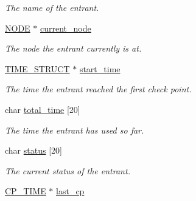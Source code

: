 \begin{DoxyCompactItemize}
\begin{DoxyCompactList}\small\item\em The name of the entrant. \end{DoxyCompactList}\item 
\hypertarget{structentrant_a3b2221eadaaa73e90690ba5d69af41e5}{\hyperlink{node_8h_a01aae0d1f45b520aec535df5f9d9afb7}{N\-O\-D\-E} $\ast$ \hyperlink{structentrant_a3b2221eadaaa73e90690ba5d69af41e5}{current\-\_\-node}}\label{structentrant_a3b2221eadaaa73e90690ba5d69af41e5}

\begin{DoxyCompactList}\small\item\em The node the entrant currently is at. \end{DoxyCompactList}\item 
\hypertarget{structentrant_a3b6806de9f87397faff889d98738cbdd}{\hyperlink{time__struct_8h_a3bbd7adf563300f0bd980d2ea319881d}{T\-I\-M\-E\-\_\-\-S\-T\-R\-U\-C\-T} $\ast$ \hyperlink{structentrant_a3b6806de9f87397faff889d98738cbdd}{start\-\_\-time}}\label{structentrant_a3b6806de9f87397faff889d98738cbdd}

\begin{DoxyCompactList}\small\item\em The time the entrant reached the first check point. \end{DoxyCompactList}\item 
\hypertarget{structentrant_a95af89e9dc5ba12bf0b0579537a1a6e4}{char \hyperlink{structentrant_a95af89e9dc5ba12bf0b0579537a1a6e4}{total\-\_\-time} \mbox{[}20\mbox{]}}\label{structentrant_a95af89e9dc5ba12bf0b0579537a1a6e4}

\begin{DoxyCompactList}\small\item\em The time the entrant has used so far. \end{DoxyCompactList}\item 
char \hyperlink{structentrant_a37176427e9cc8045ff719ddc71073e16}{status} \mbox{[}20\mbox{]}
\begin{DoxyCompactList}\small\item\em The current status of the entrant. \end{DoxyCompactList}\item 
\hypertarget{structentrant_a54a036dca6116e60c4c81610f0131e9a}{\hyperlink{cp__time_8h_a882d2e5771b02eac787fc6614dc7fa61}{C\-P\-\_\-\-T\-I\-M\-E} $\ast$ \hyperlink{structentrant_a54a036dca6116e60c4c81610f0131e9a}{last\-\_\-cp}}\label{structentrant_a54a036dca6116e60c4c81610f0131e9a}


\end{DoxyCompactItemize}
